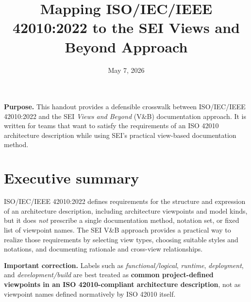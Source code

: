 \documentclass[11pt]{article}
\title{Mapping ISO/IEC/IEEE 42010:2022 to the SEI Views and Beyond Approach}
\author{}
\date{May 7, 2026}
\begin{document}
\maketitle

\begin{center}
\begin{minipage}{0.94\textwidth}
\small
\textbf{Purpose.} This handout provides a defensible crosswalk between ISO/IEC/IEEE 42010:2022 and the SEI \emph{Views and Beyond} (V\&B) documentation approach. It is written for teams that want to satisfy the requirements of an ISO 42010 architecture description while using SEI's practical view-based documentation method.\cite{iso42010,conceptualmodel,vandb}
\end{minipage}
\end{center}

\section*{Executive summary}
ISO/IEC/IEEE 42010:2022 defines requirements for the structure and expression of an architecture description, including architecture viewpoints and model kinds, but it does \emph{not} prescribe a single documentation method, notation set, or fixed list of viewpoint names.\cite{iso42010,conceptualmodel} The SEI V\&B approach provides a practical way to realize those requirements by selecting view types, choosing suitable styles and notations, and documenting rationale and cross-view relationships.\cite{iso42010,vandb}

\textbf{Important correction.} Labels such as \emph{functional/logical}, \emph{runtime}, \emph{deployment}, and \emph{development/build} are best treated as \textbf{common project-defined viewpoints in an ISO 42010-compliant architecture description}, not as viewpoint names defined normatively by ISO 42010 itself.\cite{iso42010,conceptualmodel}
\end{document}
